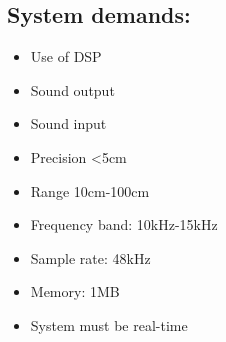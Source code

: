 \subsection{System demands:}
\begin{itemize}
\item Use of DSP
\item Sound output
\item Sound input
\item Precision <5cm
\item Range 10cm-100cm
\item Frequency band: 10kHz-15kHz
\item Sample rate: 48kHz
\item Memory: 1MB
\item System must be real-time
\end{itemize}